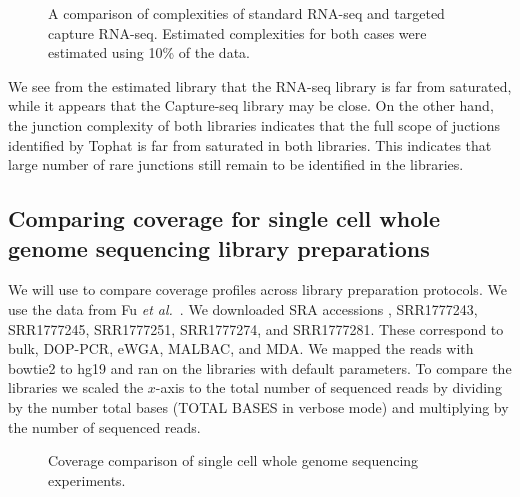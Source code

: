\documentclass[11pt, titlepage]{article}
\begin{document}
\begin{figure}[h!]
\caption{A comparison of complexities of standard RNA-seq and 
targeted capture RNA-seq.  Estimated complexities for both cases were 
estimated using 10\% of the data.}
\end{figure}

We see from the estimated library that the RNA-seq library is far
from saturated, while it appears that the Capture-seq library
may be close.  On the other hand, the junction complexity of
both libraries indicates that the full scope of juctions identified
by Tophat is far from saturated in both libraries.  This indicates
that large number of rare junctions still remain to be identified
in the libraries.


\newpage

\subsection*{Comparing coverage for single cell whole genome sequencing library preparations}

We will use  to compare coverage profiles
across library preparation protocols.  We use the data
from Fu {\em et al.}~\cite{fu2015uniform}.  
We downloaded SRA accessions , 
SRR1777243, SRR1777245, SRR1777251, 
SRR1777274, and SRR1777281.
These correspond to bulk, DOP-PCR,
eWGA, MALBAC, and MDA.
We mapped the reads with bowtie2 to hg19
and ran  on the libraries with default
parameters.  To compare the libraries we scaled 
the $x$-axis to the total number of sequenced
reads by dividing by the number total bases
(TOTAL BASES in verbose mode) and multiplying
by the number of sequenced reads.

\begin{figure}[h!]
\caption{Coverage comparison of single cell 
whole genome sequencing experiments.}
\end{figure}
\end{document}
